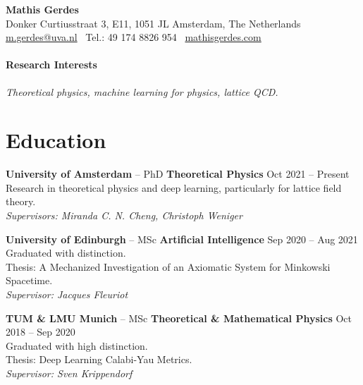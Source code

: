 \documentclass[11pt, a4paper]{article}
\newcommand{\dateright}[1]{\hfill{\small\color{accentblue} #1}}
\begin{document}
\begin{center}
    {\LARGE \textbf{Mathis Gerdes}} \\
    \vspace{0.15cm}
    Donker Curtiusstraat 3, E11, 1051 JL Amsterdam, The Netherlands \\
    \href{mailto:m.gerdes@uva.nl}{m.gerdes@uva.nl} \textbullet\
    Tel.: \raisebox{0.2\height}{\footnotesize +}49 174 8826 954 \textbullet\
    \href{http://www.mathisgerdes.com}{mathisgerdes.com}
\end{center}

\vspace{0.3cm}

\paragraph{Research Interests}
\textit{Theoretical physics, machine learning for physics, lattice QCD.}

\section*{Education}
\noindent
\textbf{University of Amsterdam} -- PhD \textbf{Theoretical Physics} \dateright{Oct 2021 -- Present} \\
Research in theoretical physics and deep learning, particularly for lattice field theory. \\
\textit{Supervisors: Miranda C. N. Cheng, Christoph Weniger}

\vspace{0.2cm}

\noindent
\textbf{University of Edinburgh} -- MSc \textbf{Artificial Intelligence} \dateright{Sep 2020 -- Aug 2021} \\
Graduated with distinction. \\
Thesis: A Mechanized Investigation of an Axiomatic System for Minkowski Spacetime. \\
\textit{Supervisor: Jacques Fleuriot}

\vspace{0.2cm}

\noindent
\textbf{TUM \& LMU Munich} -- MSc \textbf{Theoretical \& Mathematical Physics} \dateright{Oct 2018 -- Sep 2020} \\
Graduated with high distinction. \\
Thesis: Deep Learning Calabi-Yau Metrics. \\
\textit{Supervisor: Sven Krippendorf}
\end{document}
